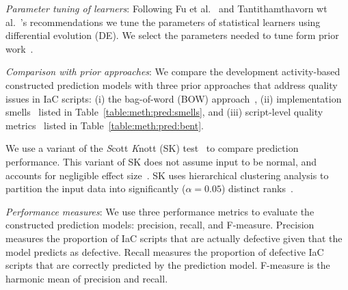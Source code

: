 \documentclass[smallextended]{svjour3}       %
\begin{document}
\textit{Parameter tuning of learners}: Following Fu et al.~\citep{Fu2016} and Tantithamthavorn wt al.~\citep{Chakkrit:ICSE16}'s recommendations we tune the parameters of statistical learners using differential evolution (DE). We select the parameters needed to tune form prior work~\citep{Fu2016}. 

\textit{Comparison with prior approaches}: We compare the development activity-based constructed prediction models with three prior approaches that address quality issues in IaC scripts: (i) the bag-of-word (BOW) approach~\citep{me:icst2018:iac}, (ii) implementation smells~\citep{SharmaPuppet2016} listed in Table~\ref{table:meth:pred:smells}, and (iii) script-level quality metrics~\citep{Bent:Saner2018:Puppet} listed in Table~\ref{table:meth:pred:bent}. 

We use a variant of the \textit{S}cott \textit{K}nott (SK) test~\citep{Chakkrit:TSE2017} to compare prediction performance. This variant of SK does not assume input to be normal, and accounts for negligible effect size~\citep{Chakkrit:TSE2017}. SK uses hierarchical clustering analysis to partition the input data into significantly ($\alpha=0.05$) distinct ranks~\citep{Chakkrit:TSE2017}.

\textit{Performance measures}: We use three performance metrics to evaluate the constructed prediction models: precision, recall, and F-measure. Precision measures the proportion of IaC scripts that are actually defective given that the model predicts as defective. Recall measures the proportion of defective IaC scripts that are correctly predicted by the prediction model. F-measure is the harmonic mean of precision and recall.

\end{document}
